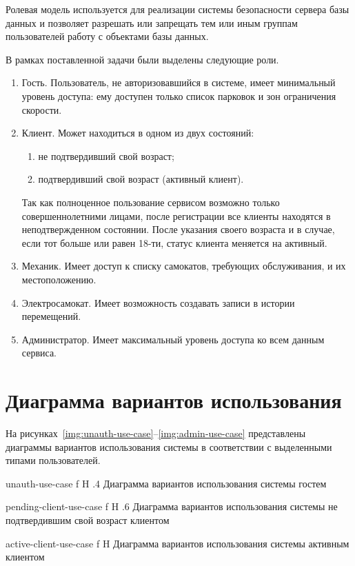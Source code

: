 Ролевая модель используется для реализации системы безопасности сервера базы данных и позволяет разрешать или запрещать тем или иным группам пользователей работу с объектами базы данных.

В рамках поставленной задачи были выделены следующие роли.

\begin{enumerate}
	\item Гость. Пользователь, не авторизовавшийся в системе, имеет минимальный уровень доступа: ему доступен только список парковок и зон ограничения скорости.
	\item Клиент. Может находиться в одном из двух состояний:
	      \begin{enumerate}
		      \item не подтвердивший свой возраст;
		      \item подтвердивший свой возраст (активный клиент).
	      \end{enumerate}
	      Так как полноценное пользование сервисом возможно только совершеннолетними лицами, после регистрации все клиенты находятся в неподтвержденном состоянии. После указания своего возраста и в случае, если тот больше или равен 18-ти, статус клиента меняется на активный.
	\item Механик. Имеет доступ к списку самокатов, требующих обслуживания, и их местоположению.
	\item Электросамокат. Имеет возможность создавать записи в истории перемещений.
	\item Администратор. Имеет максимальный уровень доступа ко всем данным сервиса.
\end{enumerate}

\section{Диаграмма вариантов использования}

На рисунках~\ref{img:unauth-use-case}--\ref{img:admin-use-case} представлены диаграммы вариантов использования системы в соответствии с выделенными типами пользователей.

{unauth-use-case}
{f}
{H}
{.4\textwidth}
{Диаграмма вариантов использования системы гостем}

{pending-client-use-case}
{f}
{H}
{.6\textwidth}
{Диаграмма вариантов использования системы не подтвердившим свой возраст клиентом}

{active-client-use-case}
{f}
{H}
{\textwidth}
{Диаграмма вариантов использования системы активным клиентом}


